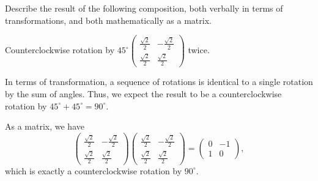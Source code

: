  
\begin{frame}[t] 
\begin{ex} 
Describe the result of the following composition, both verbally in terms of transformations, and both mathematically as a matrix.

\begin{center}
Counterclockwise rotation by $45^{\circ} \begin{pmatrix} \tfrac{\sqrt{2}}{2} & -\tfrac{\sqrt{2}}{2} \\ \tfrac{\sqrt{2}}{2} & \tfrac{\sqrt{2}}{2} \end{pmatrix}$ twice.
\end{center}
\end{ex} 
\begin{sol}
In terms of transformation, a sequence of rotations is identical to a single rotation by the sum of angles. Thus, we expect the result to be a counterclockwise rotation by $45^{\circ} + 45^{\circ} = 90^{\circ}$.

As a matrix, we have
\[\begin{pmatrix} \tfrac{\sqrt{2}}{2} & -\tfrac{\sqrt{2}}{2} \\ \tfrac{\sqrt{2}}{2} & \tfrac{\sqrt{2}}{2} \end{pmatrix}\begin{pmatrix} \tfrac{\sqrt{2}}{2} & -\tfrac{\sqrt{2}}{2} \\ \tfrac{\sqrt{2}}{2} & \tfrac{\sqrt{2}}{2} \end{pmatrix}= \begin{pmatrix} 0 & -1 \\ 1 & 0 \end{pmatrix},\]
which is exactly a counterclockwise rotation by $90^{\circ}$.
\end{sol}
\end{frame}

